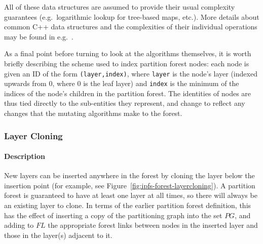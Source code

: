 \enlargethispage*{\baselineskip}

\noindent All of these data structures are assumed to provide their usual complexity guarantees (e.g.~logarithmic lookup for tree-based maps, etc.). More details about common C++ data structures and the complexities of their individual operations may be found in e.g.~\cite{stl}.

As a final point before turning to look at the algorithms themselves, it is worth briefly describing the scheme used to index partition forest nodes: each node is given an ID of the form \texttt{(layer,index)}, where \texttt{layer} is the node's layer (indexed upwards from $0$, where $0$ is the leaf layer) and \texttt{index} is the minimum of the indices of the node's children in the partition forest. The identities of nodes are thus tied directly to the sub-entities they represent, and change to reflect any changes that the mutating algorithms make to the forest.

\newpage

\subsubsection{Layer Cloning}


\paragraph{Description}

New layers can be inserted anywhere in the forest by cloning the layer below the insertion point (for example, see Figure~\ref{fig:ipfs-forest-layercloning}). A partition forest is guaranteed to have at least one layer at all times, so there will always be an existing layer to clone. In terms of the earlier partition forest definition, this has the effect of inserting a copy of the partitioning graph into the set $\textit{PG}$, and adding to $\textit{FL}$ the appropriate forest links between nodes in the inserted layer and those in the layer(s) adjacent to it.

